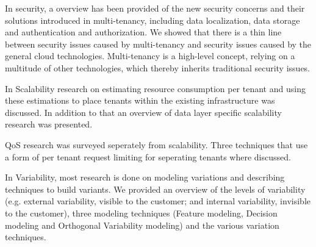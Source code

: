 \documentclass{article}
\begin{document}
In security, a overview  has been provided of the new security concerns and their solutions introduced in multi-tenancy, including data localization, data storage and authentication and authorization. We showed that there is a thin line between security issues caused by multi-tenancy and security issues caused by the general cloud technologies. Multi-tenancy is a high-level concept, relying on a multitude of other technologies, which thereby inherits traditional security issues.  

In Scalability research on estimating resource consumption per tenant and using these estimations to place tenants within the existing infrastructure was discussed. In addition to that an overview of data layer specific scalability research was presented.

\ac{QoS} research was surveyed seperately from scalability. Three techniques that use a form of per tenant request limiting for seperating tenants where discussed.

In Variability, most research is done on modeling variations and describing techniques to build variants. We provided an overview of the levels of variability (e.g. external variability, visible to the customer; and internal variability, invisible to the customer), three modeling techniques (Feature modeling, Decision modeling and Orthogonal Variability modeling) and the various variation techniques.
\end{document}
